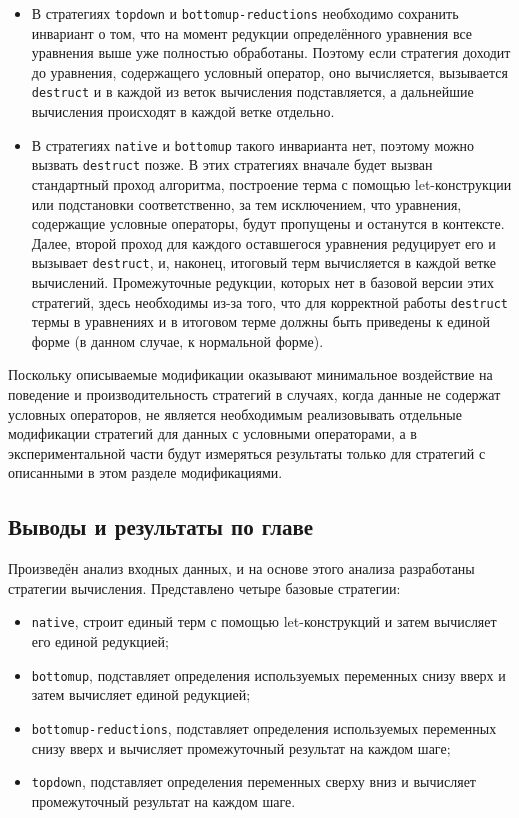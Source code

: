 \documentclass[../thesis.tex]{subfiles}
\begin{document}
\begin{itemize}
  \item В стратегиях \texttt{topdown} и \texttt{bottomup-reductions} необходимо сохранить инвариант о том, что на момент редукции определённого уравнения все уравнения выше уже полностью обработаны. Поэтому если стратегия доходит до уравнения, содержащего условный оператор, оно вычисляется, вызывается \texttt{destruct} и в каждой из веток вычисления подставляется, а дальнейшие вычисления происходят в каждой ветке отдельно.
  \item В стратегиях \texttt{native} и \texttt{bottomup} такого инварианта нет, поэтому можно вызвать \texttt{destruct} позже. В этих стратегиях вначале будет вызван стандартный проход алгоритма, построение терма с помощью let-конструкции или подстановки соответственно, за тем исключением, что уравнения, содержащие условные операторы, будут пропущены и останутся в контексте. Далее, второй проход для каждого оставшегося уравнения редуцирует его и вызывает \texttt{destruct}, и, наконец, итоговый терм вычисляется в каждой ветке вычислений. Промежуточные редукции, которых нет в базовой версии этих стратегий, здесь необходимы из-за того, что для корректной работы \texttt{destruct} термы в уравнениях и в итоговом терме должны быть приведены к единой форме (в данном случае, к нормальной форме).
\end{itemize}

Поскольку описываемые модификации оказывают минимальное воздействие на поведение и производительность стратегий в случаях, когда данные не содержат условных операторов, не является необходимым реализовывать отдельные модификации стратегий для данных с условными операторами, а в экспериментальной части будут измеряться результаты только для стратегий с описанными в этом разделе модификациями.

\subsection{Выводы и результаты по главе}

Произведён анализ входных данных, и на основе этого анализа разработаны стратегии вычисления. Представлено четыре базовые стратегии:
\begin{itemize}
    \item \texttt{native}, строит единый терм с помощью let-конструкций и затем вычисляет его единой редукцией;
    \item \texttt{bottomup}, подставляет определения используемых переменных снизу вверх и затем вычисляет единой редукцией;
    \item \texttt{bottomup-reductions}, подставляет определения используемых переменных снизу вверх и вычисляет промежуточный результат на каждом шаге;
    \item \texttt{topdown}, подставляет определения переменных сверху вниз и вычисляет промежуточный результат на каждом шаге.
\end{itemize}
\end{document}
